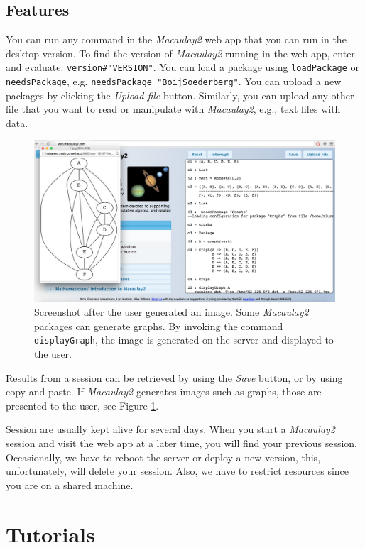 \documentclass[twocolumn]{article}
\def\M2{{\it Macaulay2}}
\begin{document}
\subsection{Features}
You can run any command in the \M2 web app that you can run in the desktop version.
To find the version of \M2 running in the web app,
enter and evaluate: {\tt version\#"VERSION"}.  You can load a package
 using {\tt loadPackage} or {\tt needsPackage}, e.g. {\tt needsPackage "BoijSoederberg"}.  
You can upload a new packages by clicking the {\it Upload file}
button. Similarly, you can upload any other file that you want to 
read or manipulate with \M2, e.g., text files with data. 

\begin{figure}[htb]
    \includegraphics[width=.95\textwidth]{withGraph.jpg}
    \caption{Screenshot after the user
      generated an image. Some \M2 packages can generate
      graphs. By invoking the command {\tt displayGraph}, the image is
      generated on the server and displayed to the user.}
    \label{fig:graph}
\end{figure}

Results from a session can be retrieved by using the {\it Save}
button, or by using copy and paste. If \M2 generates
images such as graphs, those are presented to the user, see Figure \ref{fig:graph}.


Session are usually kept alive for several days. When you start a \M2 session and visit the web app at a later time, 
you will find your previous session. Occasionally, 
we have to reboot the server or deploy a new version, this, 
unfortunately, will delete your session. Also, we have to restrict resources since you are on a shared machine.

\section{Tutorials}
\end{document}
